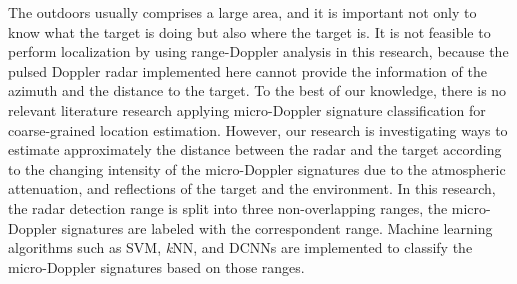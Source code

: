 The outdoors usually comprises a large area, and it is important not only to know what the target is doing but also where the target is.  It is not feasible to perform localization by using range-Doppler analysis in this research, because the pulsed Doppler radar implemented here cannot provide the information of the azimuth and the distance to the target. To the best of our knowledge, there is no relevant literature research applying micro-Doppler signature classification for coarse-grained location estimation. However, our research is investigating ways to estimate approximately the distance between the radar and the target according to the changing intensity of the micro-Doppler signatures due to the atmospheric attenuation, and reflections of the target and the environment. In this research, the radar detection range is split into three non-overlapping ranges, the micro-Doppler signatures are labeled with the correspondent range. Machine learning algorithms such as SVM, \textit{k}NN, and DCNNs are implemented to classify the micro-Doppler signatures based on those ranges.


